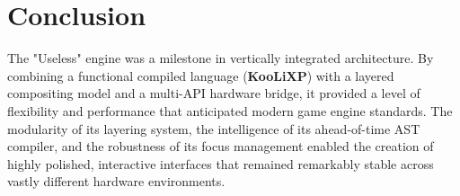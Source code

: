 \documentclass[11pt, a4paper]{article}
\begin{document}
\section{Conclusion}
The "Useless" engine was a milestone in vertically integrated architecture. By combining a functional compiled language (\textbf{KooLiXP}) with a layered compositing model and a multi-API hardware bridge, it provided a level of flexibility and performance that anticipated modern game engine standards. The modularity of its layering system, the intelligence of its ahead-of-time AST compiler, and the robustness of its focus management enabled the creation of highly polished, interactive interfaces that remained remarkably stable across vastly different hardware environments.
\end{document}
